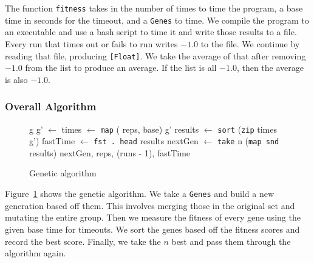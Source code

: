 \documentclass[preprint,nocopyrightspace]{sigplanconf}
\begin{document}
The function \lstinline!fitness! takes in the number of times to time the program, a base time in seconds for the timeout, and a \lstinline!Genes! to time. We compile the program to an executable and use a bash script to time it and write those results to a file. Every run that times out or fails to run writes $-1.0$ to the file. We continue by reading that file, producing \lstinline![Float]!. We take the average of that after removing $-1.0$ from the list to produce an average. If the list is all $-1.0$, then the average is also $-1.0$.
\subsubsection{Overall Algorithm}
\begin{figure}[t]
\begin{algorithmic}
 \State\Return g
\EndIf
\State g' $\gets$ 
\State times $\gets$ \lstinline!map! ( {reps, base}) g'
\State results $\gets$ \lstinline!sort! (\lstinline!zip! times g')
\State fastTime $\gets$ \lstinline!fst . head! results
\State nextGen $\gets$ \lstinline!take! n (\lstinline!map snd! results)
\State\Return{} {nextGen, reps, (runs - 1), fastTime}
\EndFunction
\end{algorithmic}
\caption{Genetic algorithm}
\label{alg:overall}
\end{figure}

Figure~\ref{alg:overall} shows the genetic algorithm. We take a \lstinline!Genes! and build a new generation based off them. This involves merging those in the original set and mutating the entire group. Then we measure the fitness of every gene using the given base time for timeouts. We sort the genes based off the fitness scores and record the best score. Finally, we take the $n$ best and pass them through the algorithm again.
\end{document}
